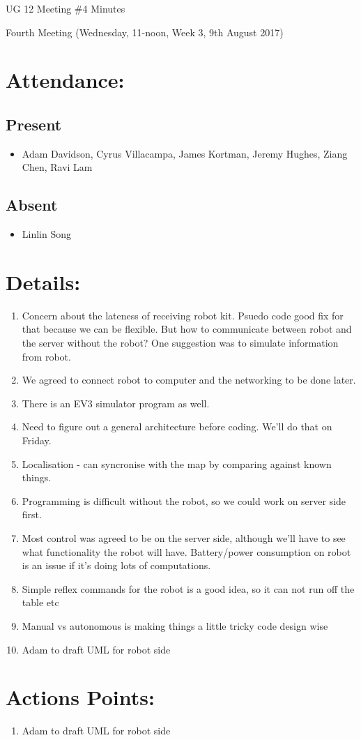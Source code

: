 \documentclass{article}
\begin{document}
\begin{adjustwidth}{2.5em}{0pt}
\begin{center}
\Large{UG 12 Meeting \#4 Minutes}\\
\end{center}
\end{adjustwidth}


Fourth Meeting (Wednesday, 11-noon, Week 3, 9th August 2017)
\section{Attendance:}
\subsection*{Present}
\begin{itemize}
\item Adam Davidson, Cyrus Villacampa, James Kortman, Jeremy Hughes, Ziang Chen, Ravi Lam
\end{itemize}
\subsection*{Absent}
\begin{itemize}
\item Linlin Song
\end {itemize}

\section{Details:}
\begin{enumerate}
\item Concern about the lateness of receiving robot kit. Psuedo code good fix for that because we can be flexible. But how to communicate between robot and the server without the robot? One suggestion was to simulate information from robot.
\item We agreed to connect robot to computer and the networking to be done later.
\item There is an EV3 simulator program as well.
\item Need to figure out a general architecture before coding. We'll do that on Friday.
\item Localisation - can syncronise with the map by comparing against known things.
\item Programming is difficult without the robot, so we could work on server side first.
\item Most control was agreed to be on the server side, although we'll have to see what functionality the robot will have. Battery/power consumption on robot is an issue if it's doing lots of computations.
\item Simple reflex commands for the robot is a good idea, so it can not run off the table etc
\item Manual vs autonomous is making things a little tricky code design wise
\item Adam to draft UML for robot side
\end{enumerate}

\section{Actions Points:}
\begin{enumerate}
\item Adam to draft UML for robot side
\end{enumerate}
\end{document}
